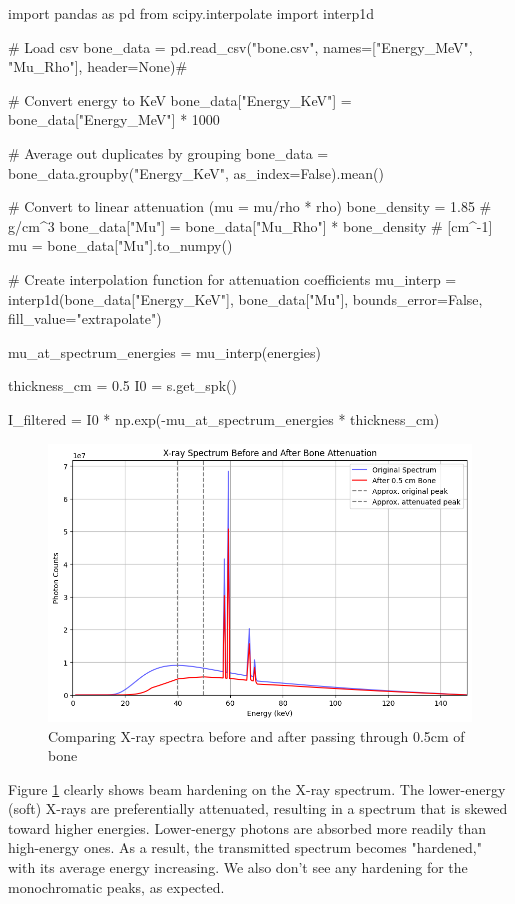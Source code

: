 \documentclass{article}
\begin{document}
\begin{python}
import pandas as pd
from scipy.interpolate import interp1d

# Load csv
bone_data = pd.read_csv("bone.csv", names=["Energy_MeV", "Mu_Rho"], header=None)#

# Convert energy to KeV
bone_data["Energy_KeV"] = bone_data["Energy_MeV"] * 1000

# Average out duplicates by grouping
bone_data = bone_data.groupby("Energy_KeV", as_index=False).mean()

# Convert to linear attenuation (mu = mu/rho * rho)
bone_density = 1.85  # g/cm^3
bone_data["Mu"] = bone_data["Mu_Rho"] * bone_density  # [cm^-1]
mu = bone_data["Mu"].to_numpy()

# Create interpolation function for attenuation coefficients
mu_interp = interp1d(bone_data["Energy_KeV"], bone_data["Mu"], bounds_error=False, fill_value="extrapolate")

mu_at_spectrum_energies = mu_interp(energies)

thickness_cm = 0.5
I0 = s.get_spk()

I_filtered = I0 * np.exp(-mu_at_spectrum_energies * thickness_cm)
\end{python}

\begin{figure}[H]
	\includegraphics[width=\linewidth]{beamhardening.png}
	\caption{Comparing X-ray spectra before and after passing through 0.5cm of bone}
  \label{fig:beamhardening}
\end{figure}

Figure \ref{fig:beamhardening} clearly shows beam hardening on the X-ray spectrum. The lower-energy (soft) X-rays are preferentially attenuated, resulting in a spectrum that is skewed toward higher energies. Lower-energy photons are absorbed more readily than high-energy ones. As a result, the transmitted spectrum becomes "hardened," with its average energy increasing. We also don't see any hardening for the monochromatic peaks, as expected. 
\end{document}
